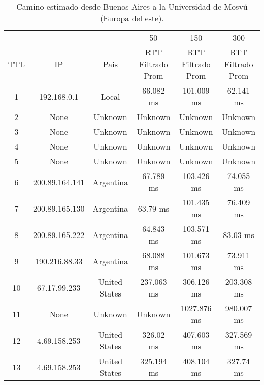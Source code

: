 \begin{table}[]
\centering
\caption{Camino estimado desde Buenos Aires a la Universidad de Mosvú (Europa del este).}
\begin{tabular}{ | c | c | c | c | c | c | }
\hline
 & & & 50 & 150 & 300 \\ %
TTL	&         IP    &     	        Pais     &   	 RTT Filtrado Prom&  	 RTT Filtrado Prom&  	 RTT Filtrado Prom  \\ \hline
1	&192.168.0.1    &     	       Local     &   	      66.082 ms   &  	     101.009 ms   &  	      62.141 ms \\ \hline    
2	&None           &     	      Unknown    &   	      Unknown     &  	      Unknown     &  	      Unknown   \\ \hline    
3	&None           &     	      Unknown    &   	      Unknown     &  	      Unknown     &  	      Unknown   \\ \hline    
4	&None           &     	      Unknown    &   	      Unknown     &  	      Unknown     &  	      Unknown   \\ \hline    
5	&None           &     	      Unknown    &   	      Unknown     &  	      Unknown     &  	      Unknown   \\ \hline    
6	&200.89.164.141 &     	     Argentina   &   	      67.789 ms   &  	     103.426 ms   &  	      74.055 ms \\ \hline    
7	&200.89.165.130 &     	     Argentina   &   	       63.79 ms   &  	     101.435 ms   &  	      76.409 ms \\ \hline    
8	&200.89.165.222 &     	     Argentina   &   	      64.843 ms   &  	     103.571 ms   &  	       83.03 ms \\ \hline    
9	&190.216.88.33  &     	     Argentina   &   	      68.088 ms   &  	     101.673 ms   &  	      73.911 ms \\ \hline    
10	&67.17.99.233   &     	   United States &   	     237.063 ms   &  	     306.126 ms   &  	     203.308 ms \\ \hline    
11	&None           &     	      Unknown    &   	      Unknown     &  	    1027.876 ms   &  	     980.007 ms \\ \hline    
12	&4.69.158.253   &     	   United States &   	      326.02 ms   &  	     407.603 ms   &  	     327.569 ms \\ \hline    
13	&4.69.158.253   &     	   United States &   	     325.194 ms   &  	     408.104 ms   &  	      327.74 ms \\ \hline    

\end{tabular}
\end{table}
